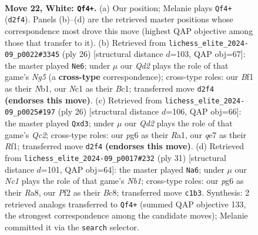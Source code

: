 \documentclass[11pt]{article}
\begin{document}
\begin{figure}[p]
\label{fig:thought-m40}
\end{figure}

\clearpage

\begin{figure}[p]\centering
\begin{subfigure}{0.46\textwidth}\centering
\resizebox{\linewidth}{!}{%
\newchessgame
\chessboard[
  setfen={r1b1rk2/3nq2p/ppn1p1p1/2p1P3/P2p4/2P5/1P1Q1PPP/1KN1RBNR w - - 1 22},
  showmover=false,
  pgfstyle=straightmove, color=movearrow, markmove={d2-f4}
]}
\caption{}
\end{subfigure}\hfill
\begin{subfigure}{0.46\textwidth}\centering
\resizebox{\linewidth}{!}{%
\newchessgame
\chessboard[
  setfen={r2qk2r/1pp1b1p1/p1n2n1p/3p2N1/3Pp3/2P2P2/PPQ3PP/RNB1R1K1 w kq - 0 14},
  showmover=false,
  pgfstyle=straightmove, color=movearrow, markmove={g5-e6}
]}
\caption{}
\end{subfigure}
\\[4pt]
\begin{subfigure}{0.46\textwidth}\centering
\resizebox{\linewidth}{!}{%
\newchessgame
\chessboard[
  setfen={r2qk2r/ppp2ppp/3p1n2/3Pp2b/2P2P2/2BnP3/PPQN2PP/R4RK1 w kq - 0 14},
  showmover=false,
  pgfstyle=straightmove, color=movearrow, markmove={c2-d3}
]}
\caption{}
\end{subfigure}\hfill
\begin{subfigure}{0.46\textwidth}\centering
\resizebox{\linewidth}{!}{%
\newchessgame
\chessboard[
  setfen={rnb1r1k1/1p2P1bp/2pq2p1/8/p1Pp4/P2P1NP1/1P2QPBP/RN2R1K1 b - - 1 16},
  showmover=false,
  pgfstyle=straightmove, color=movearrow, markmove={b8-a6}
]}
\caption{}
\end{subfigure}
\caption{\textbf{Move 22, White: \texttt{Qf4+}.} (a) Our position; Melanie plays \texttt{Qf4+} (\texttt{d2f4}). Panels (b)--(d) are the retrieved master positions whose correspondence most drove this move (highest QAP objective among those that transfer to it). (b) Retrieved from \texttt{lichess\_elite\_2024-09\_p0022\#3345} (ply 26) [structural distance $d$=103, QAP obj=67]: the master played \texttt{Ne6}; under $\mu$ our \emph{Qd2} plays the role of that game's \emph{Ng5} (a \textbf{cross-type} correspondence); cross-type roles: our \emph{B}f1 as their \emph{N}b1, our \emph{N}c1 as their \emph{B}c1; transferred move \texttt{d2f4} \textbf{(endorses this move)}. (c) Retrieved from \texttt{lichess\_elite\_2024-09\_p0025\#197} (ply 26) [structural distance $d$=106, QAP obj=66]: the master played \texttt{Qxd3}; under $\mu$ our \emph{Qd2} plays the role of that game's \emph{Qc2}; cross-type roles: our \emph{p}g6 as their \emph{R}a1, our \emph{q}e7 as their \emph{R}f1; transferred move \texttt{d2f4} \textbf{(endorses this move)}. (d) Retrieved from \texttt{lichess\_elite\_2024-09\_p0017\#232} (ply 31) [structural distance $d$=101, QAP obj=64]: the master played \texttt{Na6}; under $\mu$ our \emph{Nc1} plays the role of that game's \emph{Nb1}; cross-type roles: our \emph{p}g6 as their \emph{R}a8, our \emph{P}f2 as their \emph{B}c8; transferred move \texttt{c1b3}. Synthesis: 2 retrieved analogs transferred to \texttt{Qf4+} (summed QAP objective 133, the strongest correspondence among the candidate moves); Melanie committed it via the \texttt{search} selector.}

\end{figure}
\end{document}
